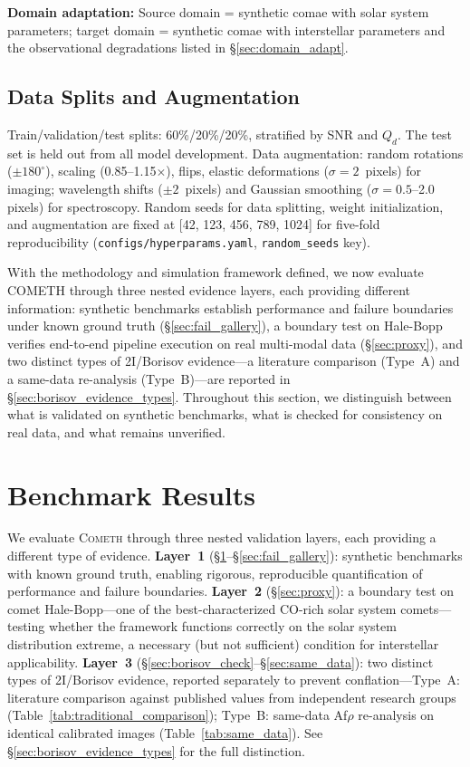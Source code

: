 \documentclass[usenatbib]{mnras}
\begin{document}
\textbf{Domain adaptation:} Source domain = synthetic comae with solar system parameters; target domain = synthetic comae with interstellar parameters and the observational degradations listed in \S\ref{sec:domain_adapt}.

\subsection{Data Splits and Augmentation}

Train/validation/test splits: 60\%/20\%/20\%, stratified by SNR and $Q_d$. The test set is held out from all model development. Data augmentation: random rotations ($\pm 180^\circ$), scaling (0.85--1.15$\times$), flips, elastic deformations ($\sigma = 2$~pixels) for imaging; wavelength shifts ($\pm 2$~pixels) and Gaussian smoothing ($\sigma = 0.5$--2.0 pixels) for spectroscopy. Random seeds for data splitting, weight initialization, and augmentation are fixed at [42, 123, 456, 789, 1024] for five-fold reproducibility (\texttt{configs/hyperparams.yaml}, \texttt{random\_seeds} key).

With the methodology and simulation framework defined, we now evaluate COMETH through three nested evidence layers, each providing different information: synthetic benchmarks establish performance and failure boundaries under known ground truth (\S\ref{sec:fail_gallery}), a boundary test on Hale-Bopp verifies end-to-end pipeline execution on real multi-modal data (\S\ref{sec:proxy}), and two distinct types of 2I/Borisov evidence---a literature comparison (Type~A) and a same-data re-analysis (Type~B)---are reported in \S\ref{sec:borisov_evidence_types}. Throughout this section, we distinguish between what is validated on synthetic benchmarks, what is checked for consistency on real data, and what remains unverified.

\section{Benchmark Results}\label{sec:results}

We evaluate \textsc{Cometh} through three nested validation layers, each providing a different type of evidence. \textbf{Layer~1} (\S\ref{sec:results}--\S\ref{sec:fail_gallery}): synthetic benchmarks with known ground truth, enabling rigorous, reproducible quantification of performance and failure boundaries. \textbf{Layer~2} (\S\ref{sec:proxy}): a boundary test on comet Hale-Bopp---one of the best-characterized CO-rich solar system comets---testing whether the framework functions correctly on the solar system distribution extreme, a necessary (but not sufficient) condition for interstellar applicability. \textbf{Layer~3} (\S\ref{sec:borisov_check}--\S\ref{sec:same_data}): two distinct types of 2I/Borisov evidence, reported separately to prevent conflation---Type~A: literature comparison against published values from independent research groups (Table~\ref{tab:traditional_comparison}); Type~B: same-data Af$\rho$ re-analysis on identical calibrated images (Table~\ref{tab:same_data}). See \S\ref{sec:borisov_evidence_types} for the full distinction.
\end{document}
